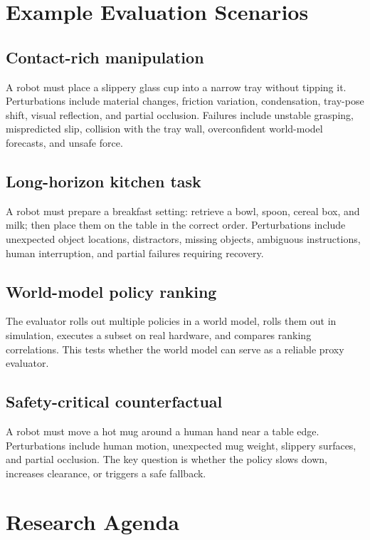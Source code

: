 \documentclass[sigconf,review,anonymous]{acmart}
\begin{document}
\section{Example Evaluation Scenarios}

\subsection{Contact-rich manipulation}

A robot must place a slippery glass cup into a narrow tray without tipping it. Perturbations include material changes, friction variation, condensation, tray-pose shift, visual reflection, and partial occlusion. Failures include unstable grasping, mispredicted slip, collision with the tray wall, overconfident world-model forecasts, and unsafe force.

\subsection{Long-horizon kitchen task}

A robot must prepare a breakfast setting: retrieve a bowl, spoon, cereal box, and milk; then place them on the table in the correct order. Perturbations include unexpected object locations, distractors, missing objects, ambiguous instructions, human interruption, and partial failures requiring recovery.

\subsection{World-model policy ranking}

The evaluator rolls out multiple policies in a world model, rolls them out in simulation, executes a subset on real hardware, and compares ranking correlations. This tests whether the world model can serve as a reliable proxy evaluator.

\subsection{Safety-critical counterfactual}

A robot must move a hot mug around a human hand near a table edge. Perturbations include human motion, unexpected mug weight, slippery surfaces, and partial occlusion. The key question is whether the policy slows down, increases clearance, or triggers a safe fallback.

\section{Research Agenda}
\end{document}
